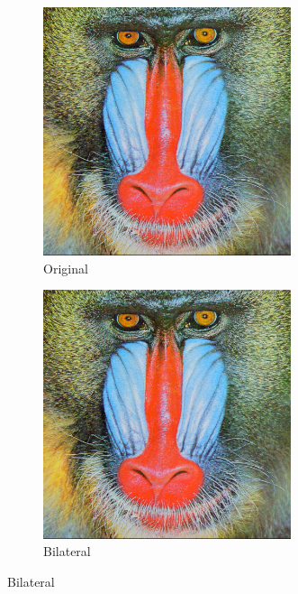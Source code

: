 \documentclass[12pt]{article}
\begin{document}
	\begin{figure}
		\centering
		\begin{subfigure}{0.4\textwidth}
			\centering
			\includegraphics[width=0.8\textwidth]{mandrill/mandrill.png}
			\caption{Original}
		\end{subfigure}
		\begin{subfigure}{0.4\textwidth}
			\centering
			\includegraphics[width=0.8\textwidth]{mandrill/mandrilltiffBilateralFilter.png}
			\caption{Bilateral}
		\end{subfigure}
		

\end{figure}
\end{document}
